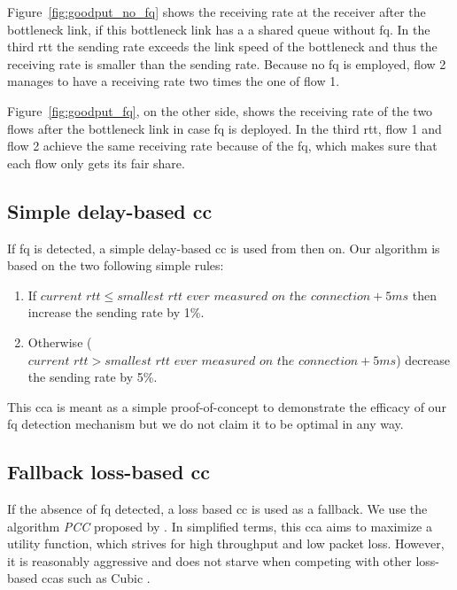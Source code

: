 \documentclass[runningheads]{llncs}
\begin{document}
Figure~\ref{fig:goodput_no_fq} shows the receiving rate at the receiver after the bottleneck link, if this bottleneck link has a a shared queue without \gls{fq}. In the third \gls{rtt} the sending rate exceeds the link speed of the bottleneck and thus the receiving rate is smaller than the sending rate. Because no \gls{fq} is employed, flow 2 manages to have a receiving rate two times the one of flow 1. 

Figure~\ref{fig:goodput_fq}, on the other side, shows the receiving rate of the two flows after the bottleneck link in case \gls{fq} is deployed. In the third \gls{rtt}, flow 1 and flow 2 achieve the same receiving rate because of the \gls{fq}, which makes sure that each flow only gets its fair share. 

\subsection{Simple delay-based \gls{cc}}

If \gls{fq} is detected, a simple delay-based \gls{cc} is used from then on. Our algorithm is based on the two following simple rules:
\begin{enumerate}
\item If $\textit{current rtt} \leq \textit{smallest rtt ever measured on the connection} + 5\textit{ms}$ then increase the sending rate by 1\%.
\item Otherwise ($\textit{current rtt} > \textit{smallest rtt ever measured on the connection} + 5\textit{ms}$) decrease the sending rate by 5\%.
\end{enumerate}

This \gls{cca} is meant as a simple proof-of-concept to demonstrate the efficacy of our \gls{fq} detection mechanism but we do not claim it to be optimal in any way. 

\subsection{Fallback loss-based \gls{cc}}

If the absence of \gls{fq} detected, a loss based \gls{cc} is used as a fallback. We use the algorithm \textit{PCC} proposed by \cite{dong_pcc_2015}. In simplified terms, this \gls{cca} aims to maximize a utility function, which strives for high throughput and low packet loss. However, it is reasonably aggressive and does not starve when competing with other loss-based \glspl{cca} such as Cubic \cite{ha_cubic_2008}.
\end{document}
